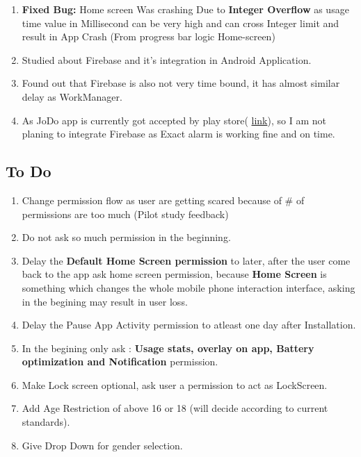 \documentclass[12pt]{article}
\begin{document}
\begin{enumerate}
\begin{enumerate}
\begin{enumerate}
                \item \textbf{Fixed Bug: } Home screen Was crashing Due to \textbf{Integer Overflow} as usage time value in Millisecond can be very high and can cross Integer limit and result in App Crash (From progress bar logic Home-screen)
                \item Studied about Firebase and it's integration in Android Application.
                \item Found out that Firebase is also not very time bound, it has almost similar delay as WorkManager.
                \item As JoDo app is currently got accepted by play store( \href{https://play.google.com/store/apps/details?id=in.ac.iitb.cse.jodo&pcampaignid=web_share}{link}),  so I am not planing to integrate Firebase as Exact alarm is working fine and on time.
               
                
           
        \end{enumerate}
    \end{enumerate}
    \subsection{To Do}
    \begin{enumerate}
        \item Change permission flow as user are getting scared because of \# of permissions are too much (Pilot study feedback)
        \item Do not ask so much permission in the beginning.
        \item Delay the \textbf{Default Home Screen permission} to later, after the user come back to the app ask home screen permission, because \textbf{Home Screen} is something which changes the whole mobile phone interaction interface, asking in the begining may result in user loss.
        \item Delay the Pause App Activity permission to atleast one day after Installation.
        \item In the begining only ask : \textbf{Usage stats, overlay on app, Battery optimization and Notification} permission.
        \item Make Lock screen optional, ask user a permission to act as LockScreen.
         \item Add Age Restriction of above 16 or 18 (will decide according to current standards).
         \item Give Drop Down for gender selection.
    \end{enumerate}
    \end{enumerate}
\end{document}
